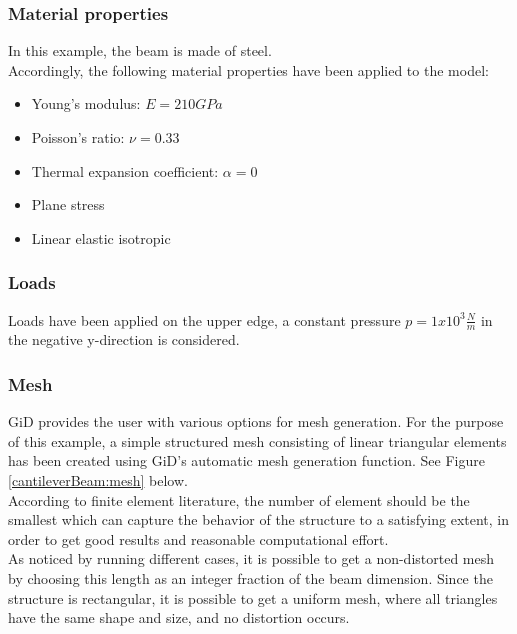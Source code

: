 \subsubsection{Material properties}
In this example, the beam is made of steel.\\[6pt]
Accordingly, the following material properties have been applied to the model: 
\begin{itemize}
\item Young's modulus: $E = 210 GPa$
\item Poisson's ratio: $\nu = 0.33$
\item Thermal expansion coefficient: $\alpha = 0$
\item Plane stress
\item Linear elastic isotropic
\end{itemize}
\subsubsection{Loads}
Loads have been applied on the upper edge, a constant pressure $p = 1x10^{3} \frac{N}{m}$ in the negative y-direction is considered.
\subsubsection{Mesh}
GiD provides the user with various options for mesh generation. For the purpose of this example, a simple structured mesh consisting of linear triangular elements has been created using GiD's automatic mesh generation function. See Figure \ref{cantileverBeam:mesh} below. \\[6pt]
According to finite element literature, the number of element should be the smallest which can capture the behavior of the structure to a satisfying extent, in order to get good results and reasonable computational effort. \\[6pt] %
As noticed by running different cases, it is possible to get a non-distorted mesh by choosing this length as an integer fraction of the beam dimension. Since the structure is rectangular, it is possible to get a uniform mesh, where all triangles have the same shape and size, and no distortion occurs. \\

